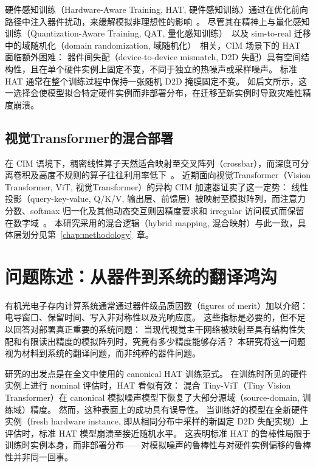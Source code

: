 硬件感知训练（Hardware-Aware Training, HAT, 硬件感知训练）通过在优化前向路径中注入器件扰动，来缓解模拟非理想性的影响~\citep{joshi2020accurate}。
尽管其在精神上与量化感知训练（Quantization-Aware Training, QAT, 量化感知训练）~\citep{choi2019pact}以及 sim-to-real 迁移中的域随机化（domain randomization, 域随机化）~\citep{tobin2017domain}相关，CIM 场景下的 HAT 面临额外困难：
器件间失配（device-to-device mismatch, D2D 失配）具有空间结构性，且在单个硬件实例上固定不变，不同于独立的热噪声或采样噪声。
标准 HAT 通常在整个训练过程中保持一张随机 D2D 掩膜固定不变。
如后文所示，这一选择会使模型拟合特定硬件实例而非部署分布，在迁移至新实例时导致灾难性精度崩溃。

\subsection{视觉Transformer的混合部署}

在 CIM 语境下，稠密线性算子天然适合映射至交叉阵列（crossbar），而深度可分离卷积及高度不规则的算子往往利用率低下~\citep{wu2023bwq,wang2024epim,ge2024allspark}。
近期面向视觉Transformer（Vision Transformer, ViT, 视觉Transformer）的异构 CIM 加速器证实了这一定势：
线性投影（query-key-value, Q/K/V, 输出层、前馈层）被映射至模拟阵列，而注意力分数、softmax 归一化及其他动态交互则因精度要求和 irregular 访问模式而保留在数字域~\citep{kim2025hemlet,lin2024hardsea}。
本研究采用的混合逻辑（hybrid mapping, 混合映射）与此一致，具体层划分见第~\ref{chap:methodology}~章。

\section{问题陈述：从器件到系统的翻译鸿沟}

有机光电子存内计算系统通常通过器件级品质因数（figures of merit）加以介绍：电导窗口、保留时间、写入非对称性以及光响应度。
这些指标是必要的，但不足以回答对部署真正重要的系统问题：
当现代视觉主干网络被映射至具有结构性失配和有限读出精度的模拟阵列时，究竟有多少精度能够存活？
本研究将这一问题视为材料到系统的翻译问题，而非纯粹的器件问题。

研究的出发点是在全文中使用的 canonical HAT 训练范式。
在训练时所见的硬件实例上进行 nominal 评估时，HAT 看似有效：
混合 Tiny-ViT（Tiny Vision Transformer）在 canonical 模拟噪声模型下恢复了大部分源域（source-domain, 训练域）精度。
然而，这种表面上的成功具有误导性。
当训练好的模型在全新硬件实例（fresh hardware instance, 即从相同分布中采样的新固定 D2D 失配实现）上评估时，标准 HAT 模型崩溃至接近随机水平。
这表明标准 HAT 的鲁棒性局限于训练时实例本身，而非部署分布——对模拟噪声的鲁棒性与对硬件实例偏移的鲁棒性并非同一回事。

